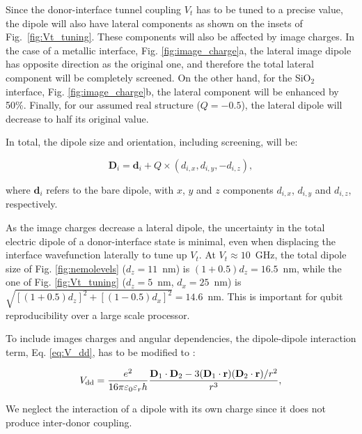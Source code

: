 Since the donor-interface tunnel coupling $V_t$ has to be tuned to a precise value, the dipole will also have lateral components as shown on the insets of Fig.~\ref{fig:Vt_tuning}. These components will also be affected by image charges. In the case of a metallic interface, Fig. \ref{fig:image_charge}a, the lateral image dipole has opposite direction as the original one, and therefore the total lateral component will be completely screened. On the other hand, for the SiO$_2$ interface, Fig. \ref{fig:image_charge}b, the lateral component will be enhanced by 50\%. Finally, for our assumed real structure ($Q=-0.5$), the lateral dipole will decrease to half its original value.

In total, the dipole size and orientation, including screening, will be:

\begin{equation} \label{eq:D_ic}
\textbf{D}_i=\textbf{d}_i+Q\times(d_{i,x},d_{i,y},-d_{i,z}),
\end{equation}

where $\textbf{d}_i$ refers to the bare dipole, with $x$, $y$ and $z$ components $d_{i,x}$, $d_{i,y}$ and $d_{i,z}$, respectively.

As the image charges decrease a lateral dipole, the uncertainty in the total electric dipole of a donor-interface state is minimal, even when displacing the interface wavefunction laterally to tune up $V_t$. At $V_t\approx10$~GHz, the total dipole size of Fig. \ref{fig:nemolevels} ($d_z=11$~nm) is $(1+0.5)d_z=16.5$~nm, while the one of Fig. \ref{fig:Vt_tuning} ($d_z=5$~nm, $d_x=25$~nm) is $\sqrt{[(1+0.5)d_z]^2+[(1-0.5)d_x]^2}=14.6$~nm. This is important for qubit reproducibility over a large scale processor.

To include images charges and angular dependencies, the dipole-dipole interaction term, Eq. \ref{eq:V_dd}, has to be modified to \cite{Ravets2014S}:

\begin{equation} \label{eq:V_dd_ic}
V_{\rm dd}=\frac{e^2}{16\pi\varepsilon_0\varepsilon_r h}\frac{\textbf{D}_1\cdot\textbf{D}_2-3(\textbf{D}_1\cdot\textbf{r})(\textbf{D}_2\cdot\textbf{r})/r^2}{r^3},
\end{equation}

We neglect the interaction of a dipole with its own charge since it does not produce inter-donor coupling.

